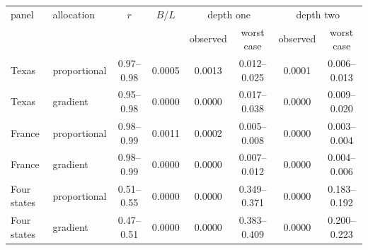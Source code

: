 \begin{tabular}{llcccccc}
\toprule
panel & allocation & $r$ & $B/L$ & \multicolumn{2}{c}{depth one} & \multicolumn{2}{c}{depth two}\\
&&&& observed & worst case & observed & worst case\\
\midrule
Texas & proportional & 0.97--0.98 & 0.0005 & 0.0013 & 0.012--0.025 & 0.0001 & 0.006--0.013\\
Texas & gradient & 0.95--0.98 & 0.0000 & 0.0000 & 0.017--0.038 & 0.0000 & 0.009--0.020\\
France & proportional & 0.98--0.99 & 0.0011 & 0.0002 & 0.005--0.008 & 0.0000 & 0.003--0.004\\
France & gradient & 0.98--0.99 & 0.0000 & 0.0000 & 0.007--0.012 & 0.0000 & 0.004--0.006\\
Four states & proportional & 0.51--0.55 & 0.0000 & 0.0000 & 0.349--0.371 & 0.0000 & 0.183--0.192\\
Four states & gradient & 0.47--0.51 & 0.0000 & 0.0000 & 0.383--0.409 & 0.0000 & 0.200--0.223\\
\bottomrule
\end{tabular}
